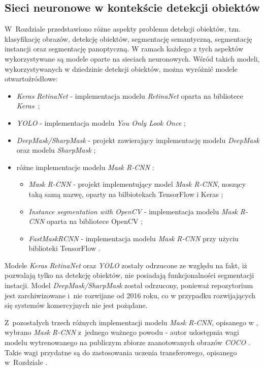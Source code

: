 \subsection{Sieci neuronowe w kontekście detekcji obiektów}

W~Rozdziale  przedstawiono różne aspekty problemu detekcji obiektów, tzn. klasyfikację obrazów, detekcję obiektów, segmentację semantyczną, segmentację instancji oraz segmentację panoptyczną. W ramach każdego z tych aspektów wykorzystywane są modele oparte na sieciach neuronowych. Wśród takich modeli, wykorzystywanych w dziedzinie detekcji obiektów, można wyróżnić modele otwartoźródłowe:

\begin{itemize}
	\item \textit{Keras RetinaNet} \cite{keras-retinanet-implementation} - implementacja modelu \textit{RetinaNet} \cite{keras-retinanet} oparta na bibliotece \textit{Keras}~\cite{keras};
	\item \textit{YOLO} \cite{yolo-implementation} - implementacja modelu \textit{You Only Look Once} \cite{yolo};
	\item \textit{DeepMask/SharpMask} \cite{deep-sharp-mask} - projekt zawierający implementację modelu \textit{DeepMask} \cite{deepmask} oraz modelu \textit{SharpMask} \cite{sharpmask};
	\item różne implementacje modelu \textit{Mask R-CNN} \cite{general-mask-rcnn}:
		\begin{itemize}
			\item \textit{Mask R-CNN} \cite{matterport-mask-rcnn} - projekt implementujący model \textit{Mask R-CNN}, noszący taką samą nazwę, oparty na bilbiotekach TensorFlow \cite{tensorflow} i Keras \cite{keras};
			\item \textit{Instance segmentation with OpenCV} \cite{mask-rcnn-opencv} - implementacja modelu \textit{Mask R-CNN} oparta na bibliotece OpenCV \cite{opencv};
			\item \textit{FastMaskRCNN} \cite{fast-mask-rcnn} - implementacja modelu \textit{Mask R-CNN} przy użyciu biblioteki TensorFlow \cite{tensorflow}.
		\end{itemize}
\end{itemize}

Modele \textit{Keras RetinaNet} oraz \textit{YOLO} zostały odrzucone ze względu na fakt, iż pozwalają tylko na detekcję obiektów, nie posiadają funkcjonalności segmentacji instacji.
Model \textit{DeepMask/SharpMask} został odrzucony, ponieważ repozytorium jest zarchiwizowane i~nie rozwijane od 2016 roku, co w przypadku rozwijających się systemów komercyjnych nie jest pożądane.

Z~pozostałych trzech różnych implementacji modelu \textit{Mask R-CNN}, opisanego w \cite{general-mask-rcnn}, wybrano \textit{Mask R-CNN} \cite{matterport-mask-rcnn} z~jednego ważnego powodu - autor udostępnia wagi modelu wytrenowanego na publiczym zbiorze zaanotowanych obrazów \textit{COCO} \cite{coco}. Takie wagi przydatne są do zastosowania uczenia transferowego, opisanego w~Rozdziale .
